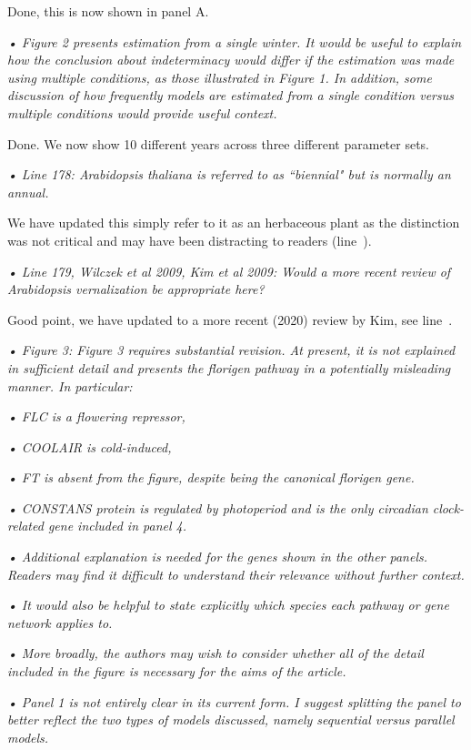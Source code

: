 \documentclass[11pt]{article}
\newcommand{\lr}[1]{line~\lineref{#1}}
\begin{document}
Done, this is now shown in panel A. 

\emph{  •	Figure 2 presents estimation from a single winter. It would be useful to explain how the conclusion about indeterminacy would differ if the estimation was made using multiple conditions, as those illustrated in Figure 1. In addition, some discussion of how frequently models are estimated from a single condition versus multiple conditions would provide useful context.}

Done. We now show 10 different years across three different parameter sets. 

\emph{•	Line 178: Arabidopsis thaliana is referred to as ``biennial" but is normally an annual.}

We have updated this simply refer to it as an herbaceous plant as the distinction was not critical and may have been distracting to readers (\lr{r1annual}). 

\emph{•	Line 179, Wilczek et al 2009, Kim et al 2009: Would a more recent review of Arabidopsis vernalization be appropriate here? }

Good point, we have updated to a more recent (2020) review by Kim, see \lr{r1morecentcite}.

\emph{•	Figure 3: Figure 3 requires substantial revision. At present, it is not explained in sufficient detail and presents the florigen pathway in a potentially misleading manner. In particular:}

\emph{ •	FLC is a flowering repressor,}

\emph{ •	COOLAIR is cold-induced,}

\emph{  •	FT is absent from the figure, despite being the canonical florigen gene.}

\emph{  •	CONSTANS protein is regulated by photoperiod and is the only circadian clock-related gene included in panel 4.}

\emph{  •	Additional explanation is needed for the genes shown in the other panels. Readers may find it difficult to understand their relevance without further context.}

\emph{  •	It would also be helpful to state explicitly which species each pathway or gene network applies to.}

\emph{  •	More broadly, the authors may wish to consider whether all of the detail included in the figure is necessary for the aims of the article.}

\emph{  •	Panel 1 is not entirely clear in its current form. I suggest splitting the panel to better reflect the two types of models discussed, namely sequential versus parallel models.}
\end{document}
